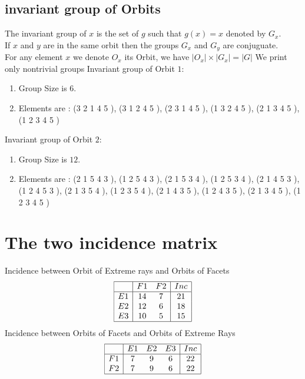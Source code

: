 \documentclass[12pt]{article}
\begin{document}
\subsection{invariant group of Orbits}
\noindent The invariant group of $x$ is the set of $g$ such that $g(x)=x$ denoted by $G_x$.\\
If $x$ and $y$ are in the same orbit then the groups $G_x$ and  $G_y$ are conjuguate.\\
For any element $x$ we denote $O_x$ its Orbit, we have $|O_x|\times |G_x|=|G|$
We print only nontrivial groups
Invariant group of Orbit $1$:
\begin{enumerate}
\item Group Size is $6$.
\item Elements are : (3 2 1 4 5  ), (3 1 2 4 5  ), (2 3 1 4 5  ), (1 3 2 4 5  ), (2 1 3 4 5  ), (1 2 3 4 5  )
\end{enumerate}
Invariant group of Orbit $2$:
\begin{enumerate}
\item Group Size is $12$.
\item Elements are : (2 1 5 4 3  ), (1 2 5 4 3  ), (2 1 5 3 4  ), (1 2 5 3 4  ), (2 1 4 5 3  ), (1 2 4 5 3  ), (2 1 3 5 4  ), (1 2 3 5 4  ), (2 1 4 3 5  ), (1 2 4 3 5  ), (2 1 3 4 5  ), (1 2 3 4 5  )
\end{enumerate}
\section{The two incidence matrix}
Incidence between Orbit of Extreme rays and Orbits of Facets
\begin{equation*}
\begin{array}{|c|cc|c|}
\hline
&F1&F2&Inc\\
\hline
E1&14&7&21\\
E2&12&6&18\\
E3&10&5&15\\
\hline
\end{array}
\end{equation*}
Incidence between Orbits of Facets and Orbits of Extreme Rays
\begin{equation*}
\begin{array}{|c|ccc|c|}
\hline
&E1&E2&E3&Inc\\
\hline
F1&7&9&6&22\\
F2&7&9&6&22\\
\hline
\end{array}
\end{equation*}
\end{document}
